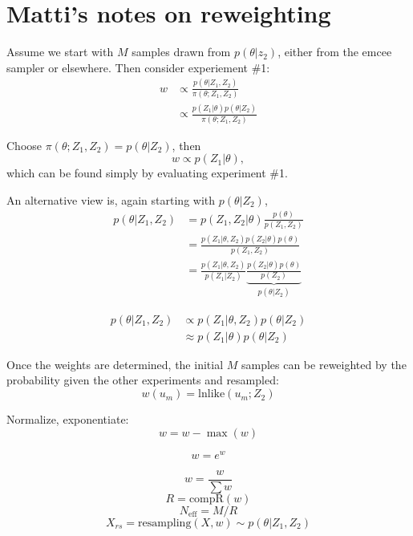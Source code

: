 \documentclass{tufte-handout}
\begin{document}
\section{Matti's notes on reweighting}
Assume we start with $M$ samples drawn from $p(\theta|z_2)$, either
from the emcee sampler or elsewhere. Then consider experiement \#1:
\begin{align}
  \label{eq:1}
  w & \propto \frac{ p(\theta|Z_1,Z_2) }{\pi(\theta; Z_1, Z_2)}\\
  & \propto \frac{ p(Z_1|\theta) p (\theta|Z_2)}{\pi(\theta; Z_1, Z_2)}
\end{align}

Choose $\pi(\theta; Z_1, Z_2) = p(\theta|Z_2)$, then
\begin{equation*}
  w \propto p(Z_1 | \theta),
\end{equation*}
which can be found simply by evaluating experiment \#1. 

An alternative view is, again starting with $p(\theta|Z_2)$,
\begin{align*}
  p(\theta|Z_1,Z_2) &= p (Z_1, Z_2 | \theta) \frac{
    p(\theta)}{p(Z_1,Z_2)} \\
& = \frac{p(Z_1|\theta, Z_2) p(Z_2|\theta) p(\theta)}{ p(Z_1,Z_2)}\\
 & = \frac{p(Z_1|\theta, Z_2)}{p(Z_1|Z_2)} \underbrace{\frac{p(Z_2|\theta)p(\theta)}{p(Z_2)}}_{p(\theta|Z_2)}
\end{align*}

\begin{align*}
  p(\theta|Z_1,Z_2)& \propto p(Z_1|\theta, Z_2) p(\theta|Z_2) \\
  & \approx p(Z_1|\theta) p(\theta|Z_2)
\end{align*}

Once the weights are determined, the initial $M$ samples can be
reweighted by the probability given the other experiments and resampled:
\begin{equation*}
  w(u_m) = \mathrm{lnlike}(u_m; Z_2)
\end{equation*}

Normalize, exponentiate:
\begin{equation*}
  w = w - \max(w)
\end{equation*}

\begin{equation*}
  w = e^w
\end{equation*}

\begin{equation*}
  w = \frac{w}{\sum w}
\end{equation*}
\begin{equation*}
  R = \mathrm{compR}(w)
\end{equation*}
\begin{equation*}
  N_{\mathrm{eff}} = M/R
\end{equation*}
\begin{equation*}
  X_{rs} = \mathrm{resampling}(X,w) \sim p(\theta|Z_1,Z_2)
\end{equation*}


\end{document}
